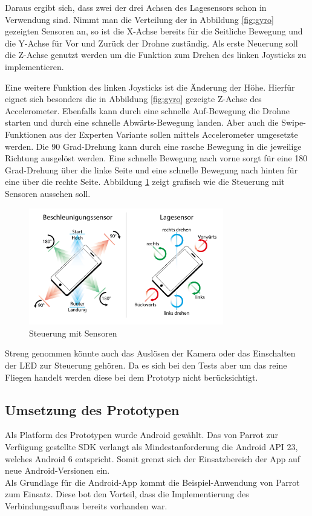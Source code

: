 \documentclass{article}
\begin{document}
Daraus ergibt sich, dass zwei der drei Achsen des Lagesensors schon in Verwendung sind. Nimmt man die Verteilung der in Abbildung \ref{fig:gyro} gezeigten Sensoren an, so ist die X-Achse bereits für die Seitliche Bewegung und die Y-Achse für Vor und Zurück der Drohne zuständig. Als erste Neuerung soll die Z-Achse genutzt werden um die Funktion zum Drehen des linken Joysticks zu implementieren. 

Eine weitere Funktion des linken Joysticks ist die Änderung der Höhe. Hierfür eignet sich besonders die in Abbildung \ref{fig:gyro} gezeigte Z-Achse des Accelerometer. Ebenfalls kann durch eine schnelle Auf-Bewegung die Drohne starten und durch eine schnelle Abwärts-Bewegung landen. Aber auch die Swipe-Funktionen aus der Experten Variante sollen mittels Accelerometer umgesetzte werden. Die 90 Grad-Drehung kann durch eine rasche Bewegung in die jeweilige Richtung ausgelöst werden. Eine schnelle Bewegung nach vorne sorgt für eine 180 Grad-Drehung über die linke Seite und eine schnelle Bewegung nach hinten für eine über die rechte Seite. Abbildung \ref{fig:gameplay} zeigt grafisch wie die Steuerung mit Sensoren aussehen soll. 

\begin{figure}
\begin{minipage}[b]{1.0\linewidth}
  \centering
\centerline{\includegraphics[width= 85mm]{gameplay}}
\end{minipage}
\caption{Steuerung mit Sensoren}
\label{fig:gameplay}
\end{figure}


Streng genommen könnte auch das Auslösen der Kamera oder das Einschalten der LED zur Steuerung gehören. Da es sich bei den Tests aber um das reine Fliegen handelt werden diese bei dem Prototyp nicht berücksichtigt.

\subsection{Umsetzung des Prototypen}
Als Platform des Prototypen wurde Android gewählt. Das von Parrot zur Verfügung gestellte SDK verlangt als Mindestanforderung die Android API 23, welches Android 6 entspricht.
Somit grenzt sich der Einsatzbereich der App auf neue Android-Versionen ein.\\
Als Grundlage für die Android-App kommt die Beispiel-Anwendung von Parrot zum Einsatz. Diese bot den Vorteil, dass die Implementierung des Verbindungsaufbaus bereits vorhanden war.
\end{document}
